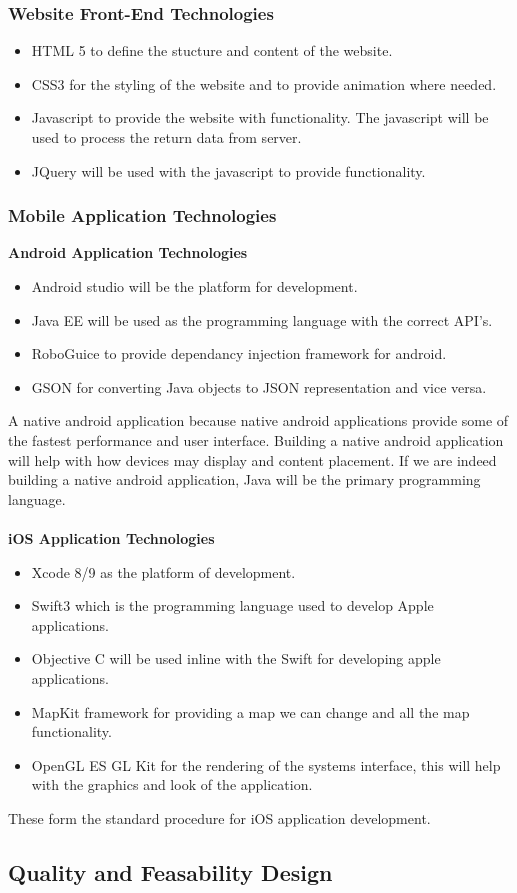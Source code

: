 \documentclass[a4paper,12pt]{report}
\begin{document}
\subsubsection{Website Front-End Technologies}
\begin{itemize}
	\item HTML 5 to define the stucture and content of the website.
	\item CSS3 for the styling of the website and to provide animation where needed.
	\item Javascript to provide the website with functionality. The javascript will be used to process the return data from server.
	\item JQuery will be used with the javascript to provide functionality.
\end{itemize}

\subsubsection{Mobile Application Technologies}
\textbf{Android Application Technologies}
\begin{itemize}
	\item Android studio will be the platform for development.
	\item Java EE will be used as the programming language with the correct API's.
	\item RoboGuice to provide dependancy injection framework for android.
	\item GSON for converting Java objects to JSON representation and vice versa.
\end{itemize}
A native android application because native android applications provide some of the fastest performance and user interface. Building a native android application will help with how devices may display and content placement. If we are indeed building a native android application, Java will be the primary programming language.\\\\
\textbf{iOS Application Technologies}
\begin{itemize}
	\item Xcode 8/9 as the platform of development.
	\item Swift3 which is the programming language used to develop Apple applications.
	\item Objective C will be used inline with the Swift for developing apple applications.
	\item MapKit framework for providing a map we can change and all the map functionality.
	\item OpenGL ES GL Kit for the rendering of the systems interface, this will help with the graphics and look of the application.
\end{itemize}
These form the standard procedure for iOS application development.
\newpage
\subsection{Quality and Feasability Design}
\end{document}
